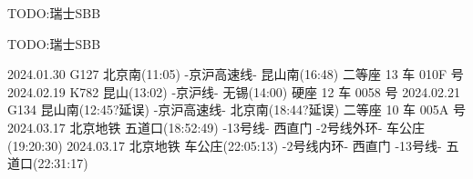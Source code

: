 TODO:瑞士SBB


TODO:瑞士SBB

2024.01.30 G127  北京南(11:05) -京沪高速线- 昆山南(16:48) 二等座 13 车 010F 号
2024.02.19 K782  昆山(13:02) -京沪线- 无锡(14:00) 硬座 12 车 0058 号
2024.02.21 G134  昆山南(12:45?延误) -京沪高速线- 北京南(18:44?延误) 二等座 10 车 005A 号
2024.03.17 北京地铁 五道口(18:52:49) -13号线- 西直门 -2号线外环- 车公庄(19:20:30)
2024.03.17 北京地铁 车公庄(22:05:13) -2号线内环- 西直门 -13号线- 五道口(22:31:17)
